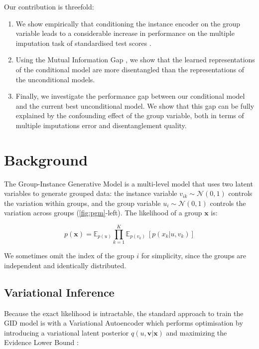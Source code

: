 \documentclass[nohyperref]{article}
\theoremstyle{plain}
\theoremstyle{definition}
\theoremstyle{remark}
\begin{document}
Our contribution is threefold:
\begin{enumerate}
    \item We show empirically that conditioning the instance encoder on the group variable leads to a considerable increase in performance on the multiple imputation task of standardised test scores \citep{Gelman2006Data}. 
    \item Using the Mutual Information Gap \citep{Chen2018IsolatingSO}, we show that the learned representations of the conditional model are more disentangled than the representations of the unconditional models. 
    \item Finally, we investigate the performance gap between our conditional model and the current best unconditional model. We show that this gap can be fully explained by the confounding effect of the group variable, both in terms of multiple imputations error and disentanglement quality.
\end{enumerate}

\section{Background}

The Group-Instance Generative Model \citep{Bouchacourt2018MultiLevelVA,Hosoya2019GroupbasedLO} is a multi-level model that uses two latent variables to generate grouped data: the instance variable $v_{ik} \sim \mathcal{N} (0,1)$ controls the variation within groups, and the group variable $u_i \sim \mathcal{N} (0, 1)$ controls the variation across groups (\cref{fig:pgm}-left). The likelihood of a group $\mathbf{x}$ is:

\begin{equation}
p(\mathbf{x}) = \mathbb{E}_{p(u)}  \prod_{k=1}^{K} \mathbb{E}_{p(v_{k})} ~ [p(x_{k} | u, v_{k})]
\end{equation}

We sometimes omit the index of the group $i$ for simplicity, since the groups are independent and identically distributed.

\subsection{Variational Inference}

Because the exact likelihood is intractable, the standard approach to train the GID model is with a Variational Autoencoder \citep{Kingma2014AutoEncodingVB,JimenezRezende2014StochasticBA} which performs optimisation by introducing a variational latent posterior $q(u, \mathbf{v} | \mathbf{x})$ and maximizing the Evidence Lower Bound \citep{Jordan2004AnIT}:
\end{document}
